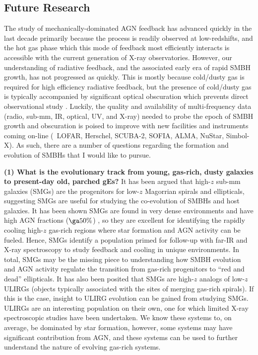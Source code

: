 \documentclass[12pt]{article}
\begin{document}
\subsection*{Future Research}
The study of mechanically-dominated AGN feedback has advanced quickly
in the last decade primarily because the process is readily observed
at low-redshifts, and the hot gas phase which this mode of feedback
most efficiently interacts is accessible with the current generation
of X-ray observatories. However, our understanding of radiative
feedback, and the associated early era of rapid SMBH growth, has not
progressed as quickly. This is mostly because cold/dusty gas is
required for high efficiency radiative feedback, but the presence of
cold/dusty gas is typically accompanied by significant optical
obscuration which prevents direct observational study
\cite{2009arXiv0911.3911A}. Luckily, the quality and availability
of multi-frequency data (radio, sub-mm, IR, optical, UV, and X-ray)
needed to probe the epoch of SMBH growth and obscuration is poised to
improve with new facilities and instruments coming on-line (\ie\
LOFAR, Herschel, SCUBA-2, SOFIA, ALMA, NuStar, Simbol-X). As such,
there are a number of questions regarding the formation and evolution
of SMBHs that I would like to pursue.


{\bf{(1) What is the evolutionary track from young, gas-rich, dusty
galaxies to present-day old, parched gEs?}} It has been argued that
high-$z$ sub-mm galaxies (SMGs) are the progenitors for low-$z$
Magorrian spirals and ellipticals, suggesting SMGs are useful for
studying the co-evolution of SMBHs and host galaxies. It has been
shown SMGs are found in very dense environments and have high AGN
fractions ($\ga 50\%$) \cite{2005ApJ...632..736A}, so they are
excellent for identifying the rapidly cooling high-$z$ gas-rich
regions where star formation and AGN activity can be fueled. Hence,
SMGs identify a population primed for follow-up with far-IR and X-ray
spectroscopy to study feedback and cooling in unique environments. In
total, SMGs may be the missing piece to understanding how SMBH
evolution and AGN activity regulate the transition from gas-rich
progenitors to ``red and dead'' ellipticals. It has also been posited
that SMGs are high-$z$ analogs of low-$z$ ULIRGs (objects typically
associated with the sites of merging gas-rich spirals). If this is the
case, insight to ULIRG evolution can be gained from studying
SMGs. ULIRGs are an interesting population on their own, one for which
limited X-ray spectroscopic studies have been undertaken. We know
these systems to, on average, be dominated by star formation, however,
some systems may have significant contribution from AGN, and these
systems can be used to further understand the nature of evolving
gas-rich systems.
\end{document}

